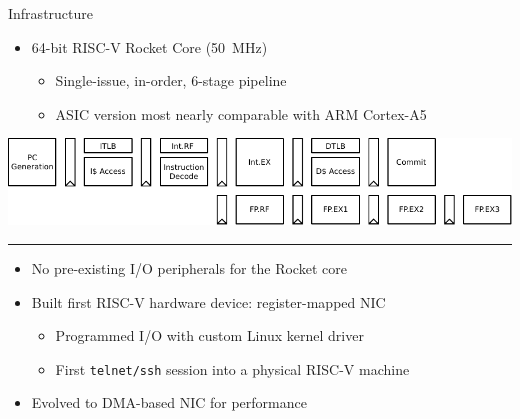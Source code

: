 \begin{block}{Infrastructure}
\begin{minipage}{0.55\linewidth}
\begin{itemize}
\item 64-bit RISC-V Rocket Core (\SI{50}{\mega\hertz})
	\begin{itemize}
	\footnotesize
	\item Single-issue, in-order, 6-stage pipeline
	\item ASIC version most nearly comparable with ARM Cortex-A5
	\end{itemize}
\end{itemize}
\vspace{\baselineskip}
\includegraphics[width=\linewidth]{img/rocket-pipeline.pdf}
\end{minipage}

\hrule
\vspace{0.5\baselineskip}
\begin{itemize}
\item No pre-existing I/O peripherals for the Rocket core
\item Built first RISC-V hardware device: register-mapped NIC
	\begin{itemize}
	\footnotesize
	\item Programmed I/O with custom Linux kernel driver
	\item First \texttt{telnet/ssh} session into a physical RISC-V machine
	\end{itemize}
\item Evolved to DMA-based NIC for performance
\end{itemize}
 
\end{block}
